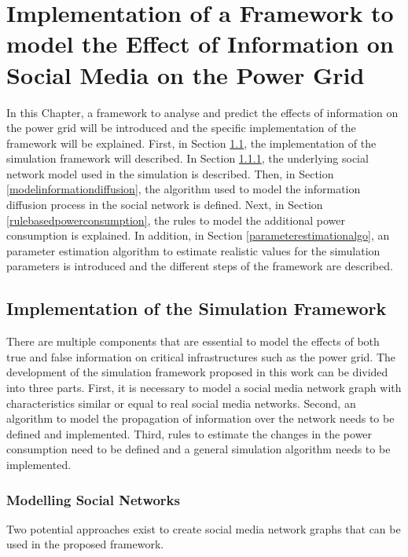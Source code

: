 \chapter{Implementation of a Framework to model the Effect
of Information on Social Media on the Power Grid}
\label{implementationall}
In this Chapter, a framework to analyse and predict 
the effects of information on the 
power grid will be introduced and the specific implementation of the 
framework will be explained.
First, in Section \ref{simulationframeworksection}, 
the implementation of the simulation framework will described.
In Section \ref{modelsocialnetwork}, the underlying social network model
used in the simulation is described. Then, in Section 
\ref{modelinformationdiffusion}, the algorithm used to model
the information diffusion process in the social network is 
defined. Next, in Section \ref{rulebasedpowerconsumption}, 
the rules to model the additional power consumption is explained.
In addition, in Section \ref{parameterestimationalgo},
an parameter estimation algorithm to estimate realistic 
values for the simulation parameters is introduced and 
the different steps of the framework are described.

\section{Implementation of the Simulation Framework}
\label{simulationframeworksection}
There are multiple components that are essential to model the effects of 
both true and false information on critical infrastructures
such as the power grid. The development of the simulation framework
proposed in this work can be divided into three parts. First, it is 
necessary to model a social media network graph with characteristics similar 
or equal to
real social media networks. Second, an algorithm to model the 
propagation of information over the network needs to be defined and 
implemented. Third, rules to estimate the changes in the power consumption 
need to be defined and a general simulation algorithm needs to be implemented.

\subsection{Modelling Social Networks}
\label{modelsocialnetwork}
Two potential approaches exist to create social media network graphs 
that can be used in the proposed framework.

